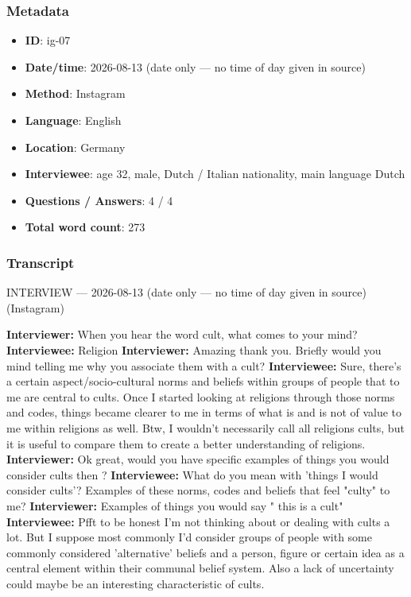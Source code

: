 \subsubsection*{Metadata}
\begin{itemize}
  \item \textbf{ID}: ig-07
  \item \textbf{Date/time}: 2026-08-13 (date only — no time of day given in source)
  \item \textbf{Method}: Instagram
  \item \textbf{Language}: English
  \item \textbf{Location}: Germany
  \item \textbf{Interviewee}: age 32, male, Dutch / Italian nationality, main language Dutch
  \item \textbf{Questions / Answers}: 4 / 4
  \item \textbf{Total word count}: 273
\end{itemize}
\subsubsection*{Transcript}
INTERVIEW — 2026-08-13 (date only — no time of day given in source) (Instagram)

\textbf{Interviewer:} When you hear the word cult, what comes to your mind?
\textbf{Interviewee:} Religion
\textbf{Interviewer:} Amazing thank you. Briefly would you mind telling me why you associate them with a cult?
\textbf{Interviewee:} Sure, there’s a certain aspect/socio-cultural norms and beliefs within groups of people that to me are central to cults. Once I started looking at religions through those norms and codes, things became clearer to me in terms of what is and is not of value to me within religions as well. Btw, I wouldn’t necessarily call all religions cults, but it is useful to compare them to create a better understanding of religions.
\textbf{Interviewer:} Ok great, would you have specific examples of things you would consider cults then ?
\textbf{Interviewee:} What do you mean with 'things I would consider cults'? Examples of these norms, codes and beliefs that feel "culty" to me?
\textbf{Interviewer:} Examples of things you would say " this is a cult"
\textbf{Interviewee:} Pfft to be honest I'm not thinking about or dealing with cults a lot. But I suppose most commonly I'd consider groups of people with some commonly considered 'alternative' beliefs and a person, figure or certain idea as a central element within their communal belief system. Also a lack of uncertainty could maybe be an interesting characteristic of cults.

